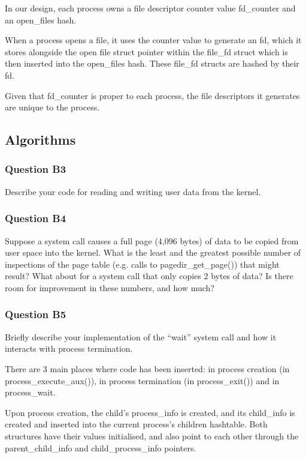 In our design, each process owns a file descriptor counter value fd\_counter and an open\_files hash.

When a process opens a file, it uses the counter value to generate an fd, which it stores alongside the open file struct pointer within the file\_fd struct which is then inserted into the open\_files hash. These file\_fd structs are hashed by their fd.

Given that fd\_counter is proper to each process, the file descriptors it generates are unique to the process.

\subsection{Algorithms}
\subsubsection*{Question B3} %
Describe your code for reading and writing user data from the kernel.

\subsubsection*{Question B4} %
Suppose a system call causes a full page (4,096 bytes) of data to be copied from user space into the kernel.  What is the least and the greatest possible number of inspections of the page table (e.g. calls to pagedir\_get\_page()) that might result?  What about for a system call that only copies 2 bytes of data?  Is there room for improvement in these numbers, and how much?

\subsubsection*{Question B5} %
Briefly describe your implementation of the ``wait'' system call and how it interacts with process termination.

There are 3 main places where code has been inserted: in process creation (in process\_execute\_aux()), in process termination (in process\_exit()) and in process\_wait.

Upon process creation, the child's process\_info is created, and its child\_info is created and inserted into the current process's children hashtable. Both structures have their values initialised, and also point to each other through the parent\_child\_info and child\_process\_info pointers.

